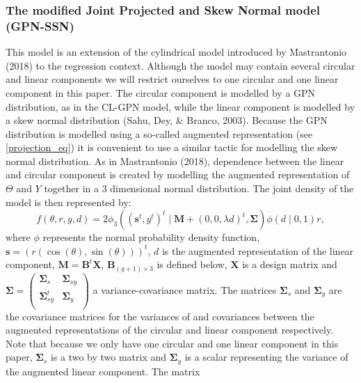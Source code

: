 \documentclass[man,mask]{apa6}
\begin{document}
\subsubsection{The modified Joint Projected and Skew Normal model (GPN-SSN)}\label{CL-GPN_multivariate}

This model is an extension of the cylindrical model introduced by
Mastrantonio (2018) to the regression context. Although the model may contain
several circular and linear components we will restrict ourselves to one
circular and one linear component in this paper. The circular component is
modelled by a GPN distribution, as in the CL-GPN model, while the linear component is modelled by a skew
normal distribution (Sahu, Dey, \& Branco, 2003). Because the GPN distribution is modelled
using a so-called augmented representation (see \eqref{projection_eq}) it is
convenient to use a similar tactic for modelling the skew normal distribution.
As in Mastrantonio (2018), dependence between the linear and circular
component is created by modelling the augmented representation of \(\Theta\) and
\(Y\) together in a 3 dimensional normal distribution. The joint density of the model is then represented by:
\begin{equation}\label{YDThetarjoint} 
f(\theta, r, y, d) = 2\phi_{3}((\boldsymbol{s}^t,
y^t)^t \mid \boldsymbol{M} + (0,0,\lambda d)^t, \boldsymbol{\Sigma})
\phi(d \mid 0, 1)r, 
\end{equation}
\noindent where \(\phi\) represents the normal probability density function, \(\boldsymbol{s} = (r(\cos(\theta), \sin(\theta)))^t\), \(d\) is
the augmented representation of the linear component, \(\boldsymbol{M} = \boldsymbol{B}^t\boldsymbol{X}\), \(\boldsymbol{B}_{(g + 1) \times 3}\) is
defined below, \(\boldsymbol{X}\) is a design matrix and \(\boldsymbol{\Sigma} = \left ( \begin{matrix} \boldsymbol{\Sigma}_s & \boldsymbol{\Sigma}_{sy} \\ \boldsymbol{\Sigma}_{sy}^t & \boldsymbol{\Sigma}_y \\ \end{matrix} \right )\) a
variance-covariance matrix. The matrices \(\boldsymbol{\Sigma}_s\) and \(\boldsymbol{\Sigma}_y\) are the
covariance matrices for the variances of and covariances between the augmented
representations of the circular and linear component respectively. Note that because we only have one circular and one linear component in this paper, \(\boldsymbol{\Sigma}_s\) is a two by two matrix and \(\boldsymbol{\Sigma}_y\) is a scalar representing the variance of the augmented linear component. The matrix
\end{document}
